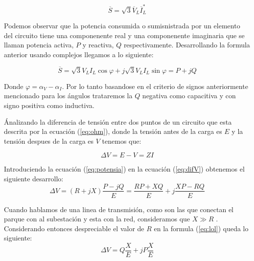\documentclass{book}
\begin{document}
\begin{equation}
	\overline{S}=\sqrt{3} \overline{V}_L  \overline{I}_L^*
\end{equation} \par

Podemos observar que la potencia consumida o sumisnistrada por un elemento del circuito tiene una componenente real y una componenente imaginaria que se llaman potencia activa, $P$ y reactiva, $Q$ respectivamente. Desarrollando la formula anterior usando complejos llegamos a lo siguiente: \par

\begin{equation}\label{eq:potensia}
	\overline{S}= \sqrt{3} V_L I_L \cos{\varphi}+j\sqrt{3} V_L I_L \sin{\varphi} = P+jQ 
\end{equation} \par

Donde $\varphi= \alpha_V-\alpha_I$. Por lo tanto basandose en el criterio de signos anteriormente mencionado para los \'angulos trataremos la $Q$ negativa como capacitiva y con signo positiva como inductiva. \par

\'Analizando la diferencia de tensi\'on entre dos puntos de un circuito que esta descrita por la ecuaci\'on (\ref{eq:ohm}), donde la tensi\'on antes de la carga es $E$ y la tensi\'on despues de la carga es $V$ tenemos que:

\begin{equation}\label{eq:difV}
	\Delta V=E-V=ZI
\end{equation} \par

 Introduciendo la ecuaci\'on (\ref{eq:potensia}) en la ecuaci\'on (\ref{eq:difV}) obtenemos el siguiente desarrollo:
\begin{equation}\label{eq:lol}
	\Delta V=(R+jX)\frac{P-jQ}{E}= \frac{RP+XQ}{E}+j\frac{XP-RQ}{E}
\end{equation} \par

Cuando hablamos de una linea de transmisi\'on, como son las que conectan el parque con al subestaci\'on y esta con la red, consideramos que $X \gg R$ \cite{WFgridcode}. Considerando entonces despreciable el valor de $R$ en la formula (\ref{eq:lol}) queda lo siguiente: 
\begin{equation}
	\Delta V= Q\frac{X}{E}+jP\frac{X}{E}
\end{equation} \par
\end{document}
